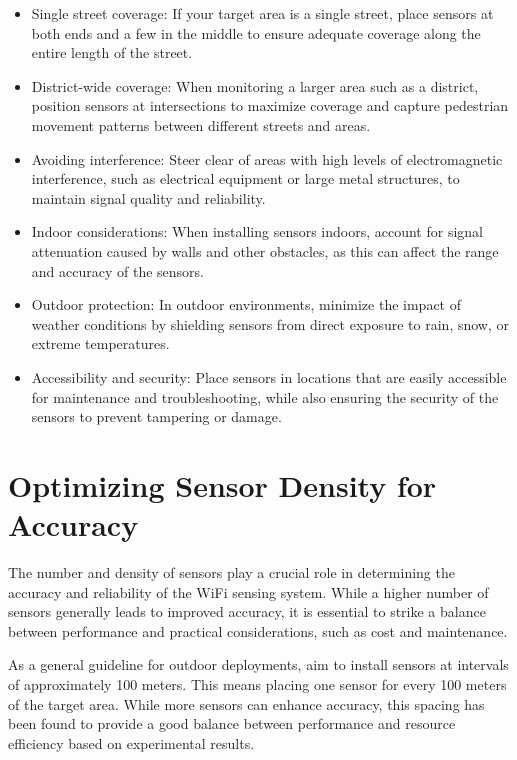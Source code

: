 \documentclass[
  letterpaper,
]{scrbook}
\providecommand{\tightlist}{%
  \setlength{\itemsep}{0pt}\setlength{\parskip}{0pt}}\usepackage{longtable,booktabs,array}
\begin{document}
\begin{itemize}
\tightlist
\item
  Single street coverage: If your target area is a single street, place
  sensors at both ends and a few in the middle to ensure adequate
  coverage along the entire length of the street.
\item
  District-wide coverage: When monitoring a larger area such as a
  district, position sensors at intersections to maximize coverage and
  capture pedestrian movement patterns between different streets and
  areas.
\item
  Avoiding interference: Steer clear of areas with high levels of
  electromagnetic interference, such as electrical equipment or large
  metal structures, to maintain signal quality and reliability.
\item
  Indoor considerations: When installing sensors indoors, account for
  signal attenuation caused by walls and other obstacles, as this can
  affect the range and accuracy of the sensors.
\item
  Outdoor protection: In outdoor environments, minimize the impact of
  weather conditions by shielding sensors from direct exposure to rain,
  snow, or extreme temperatures.
\item
  Accessibility and security: Place sensors in locations that are easily
  accessible for maintenance and troubleshooting, while also ensuring
  the security of the sensors to prevent tampering or damage.
\end{itemize}

\hypertarget{optimizing-sensor-density-for-accuracy}{%
\section{Optimizing Sensor Density for
Accuracy}\label{optimizing-sensor-density-for-accuracy}}

The number and density of sensors play a crucial role in determining the
accuracy and reliability of the WiFi sensing system. While a higher
number of sensors generally leads to improved accuracy, it is essential
to strike a balance between performance and practical considerations,
such as cost and maintenance.

As a general guideline for outdoor deployments, aim to install sensors
at intervals of approximately 100 meters. This means placing one sensor
for every 100 meters of the target area. While more sensors can enhance
accuracy, this spacing has been found to provide a good balance between
performance and resource efficiency based on experimental results.
\end{document}
